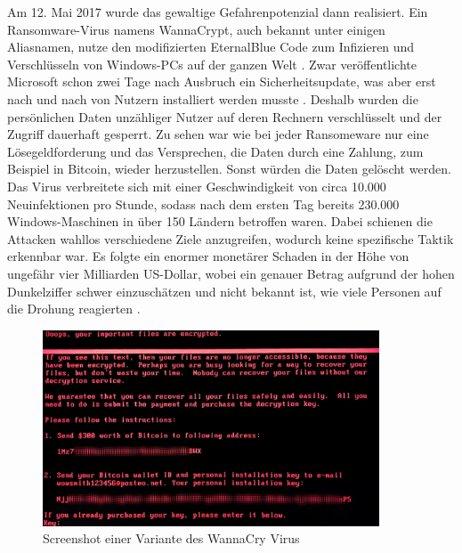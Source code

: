 \documentclass[DIV=12,headings=normal,pdftex,headinclude=false,footinclude=false,final]{scrreprt}
\begin{document}
\noindent
Am 12. Mai 2017 wurde das gewaltige Gefahrenpotenzial dann realisiert. Ein Ransomware-Virus namens WannaCrypt, auch bekannt unter einigen Aliasnamen, nutze den modifizierten EternalBlue Code zum Infizieren und Verschlüsseln von Windows-PCs auf der ganzen Welt \cite{Avast}. Zwar veröffentlichte Microsoft schon zwei Tage nach Ausbruch ein Sicherheitsupdate, was aber erst nach und nach von Nutzern installiert werden musste \cite{MSSB}. Deshalb wurden die persönlichen Daten unzähliger Nutzer auf deren Rechnern verschlüsselt und der Zugriff dauerhaft gesperrt. Zu sehen war wie bei jeder Ransomeware nur eine Lösegeldforderung und das Versprechen, die Daten durch eine Zahlung, zum Beispiel in Bitcoin, wieder herzustellen. Sonst würden die Daten gelöscht werden. Das Virus verbreitete sich mit einer Geschwindigkeit von circa 10.000 Neuinfektionen pro Stunde, sodass nach dem ersten Tag bereits 230.000 Windows-Maschinen in über 150 Ländern betroffen waren. Dabei schienen die Attacken wahllos verschiedene Ziele anzugreifen, wodurch keine spezifische Taktik erkennbar war. Es folgte ein enormer monetärer Schaden in der Höhe von ungefähr vier Milliarden US-Dollar, wobei ein genauer Betrag aufgrund der hohen Dunkelziffer schwer einzuschätzen und nicht bekannt ist, wie viele Personen auf die Drohung reagierten \cite{Avast}.

\begin{figure}[H]
    \centering
    \includegraphics[width=10cm]{notpetya_ransomware.jpg}
    \caption[NotPetya Screenshot, Nutzer ''GrEat'' (Kaspersky), URL: \url{https://media.kasperskydaily.com/wp-content/uploads/sites/92/2017/06/27133735/wannamore-ransomware-screenshot.jpg}]{Screenshot einer Variante des WannaCry Virus}
    \label{img:not_petya}
\end{figure}
\end{document}
